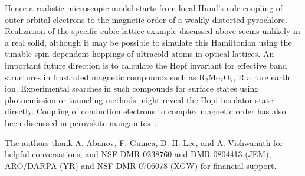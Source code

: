 \documentclass[prl,showpacs,superscriptaddress,twocolumn,preprintnumbers,amssymb,amsfonts]{revtex4}
\begin{document}
Hence a realistic microscopic model starts from local Hund's rule coupling of outer-orbital electrons to the magnetic order of a weakly distorted pyrochlore.  Realization of the specific cubic lattice example discussed above seems unlikely in a real solid, although it may be possible to simulate this Hamiltonian using the tunable spin-dependent hoppings of ultracold atoms in optical lattices.  An important future direction is to calculate the Hopf invariant for effective band structures in frustrated magnetic compounds such as R$_2$Mo$_2$O$_7$, R a rare earth ion.  Experimental searches in such compounds for surface states using photoemission or tunneling methods might reveal the Hopf insulator state directly.  Coupling of conduction electrons to complex magnetic order has also been discussed in perovskite manganites~\cite{ye}.





The authors thank A. Abanov, F. Guinea, D.-H. Lee, and A. Vishwanath for helpful
conversations, and NSF DMR-0238760 and DMR-0804413 (JEM), ARO/DARPA (YR) and
NSF DMR-0706078 (XGW) for financial support.
\end{document}
